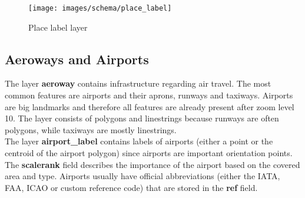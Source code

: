 \begin{figure}[H]
  \centering
  \texttt{[image: images/schema/place\_label]}
  \caption{Place label layer}
\end{figure}

\subsection{Aeroways and Airports}

\noindent\begin{minipage}[t]{0.48\linewidth}
    \vspace{0pt}
    The layer \textbf{aeroway} contains infrastructure regarding air travel. The most common features are airports and their aprons, runways and taxiways. Airports are big landmarks and therefore all features are already present after zoom level 10. The layer consists of polygons and linestrings because runways are often polygons, while taxiways are mostly linestrings.\\
    The layer \textbf{airport\_label} contains labels of airports (either a point or the centroid of the airport polygon) since airports are important orientation points. The \textbf{scalerank} field describes the importance of the airport based on the covered area and type.
    Airports usually have official abbreviations (either the IATA, FAA, ICAO or custom reference code) that are stored in the \textbf{ref} field.
\end{minipage}
\hfill
